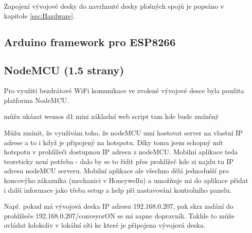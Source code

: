 Zapojení vývojové desky do navrhnuté desky plošných spojů je popsáno v kapitole \ref{sec:Hardware}.

\subsection{Arduino framework pro ESP8266}\label{sec:ArduinoFrameworkForESP8266}

\oldtext

\subsection{NodeMCU (1.5 strany)}\label{sec:NodeMCU}

Pro využití bezdrátové WiFi komunikace ve zvolené vývojové desce byla použita platforma NodeMCU.

můžu ukázat wemos d1 mini základní web script tam kde bude zmíněný \cite{NavodNaESPWebServerDratek}

Můžu zmínit, že využívám toho, že nodeMCU umí hostovat server na vlastní IP adrese a to i když je připojený na hotspotu. Díky tomu jsem schopný mít hotspotu v prohlížeči dostupnou IP adresu z nodeMCU. Mobilní aplikace teda teoreticky není potřeba - dalo by se to řídit přes prohlížeč kde si najdu tu IP adresu nodeMCU serveru. Mobilní aplikace ale všechno dělá jednodušší pro koncovýho zákazníka (mechanici v Honeywellu) a umožňuje mi do aplikace přidat i další informace jako třeba setup a help při nastavování kontrolního panelu.

Např. pokud má vývojová deska IP adresu 192.168.0.207, pak skrz zadání do prohlížeče 192.168.0.207/conveyorON se mi zapne dopravník. Takhle to může ovládat kdokoliv v lokální síti ke které je připojena vývojová deska.

